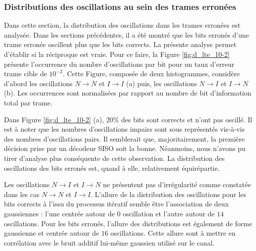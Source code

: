 \subsubsection{Distributions des oscillations au sein des trames erronées} 
Dans cette section, la distribution des oscillations dans les trames erronées est analysée. Dans les sections précédentes,
il a été montré que les bits erronés d'une trame erronée oscillent plus que les bits corrects. La présente analyse permet
d'établir si la réciproque est vraie. Pour ce faire, la Figure \ref{fig:d_lte_10-2} présente l’occurrence du nombre d'oscillations par bit pour un taux 
d'erreur trame cible de $10^{-2}$. Cette Figure, composée de deux histogrammes, considère d'abord les oscillations $N\rightarrow N$ et 
$I\rightarrow I$ (a) puis, les oscillations $N\rightarrow I$ et $I\rightarrow N$ (b). Les occurrences sont normalisées 
par rapport au nombre de bit d'information total par trame.


Dans Figure \ref{fig:d_lte_10-2} (a), $20\%$ des bits sont corrects et n'ont pas oscillé. Il est à noter que 
les nombres d'oscillations impairs sont sous représentés vis-à-vis des nombres d'oscillations pairs. Il semblerait que, 
majoritairement, la première décision prise par un décodeur SISO soit la bonne. Néanmoins, nous n'avons pu tirer d'analyse 
plus conséquente de 
cette observation. La distribution des oscillations des bits erronés est, quand à elle, relativement équirépartie. 

Les oscillations $N\rightarrow I$ et $I\rightarrow N$ ne présentent pas d’irrégularité comme constatée dans les cas 
$N\rightarrow N$ et $I\rightarrow I$. L'allure de la distribution des oscillations pour les bits corrects à l'issu du 
processus itératif semble être l'association de deux gaussiennes : l'une centrée autour de $0$ oscillation et l'autre 
autour de $14$ oscillations. Pour les 
bits erronés, l'allure des distributions est également de forme gaussienne et centrée autour de $16$ oscillations. Cette allure sont à
mettre en corrélation avec le bruit additif lui-même gaussien utilisé sur le canal.

